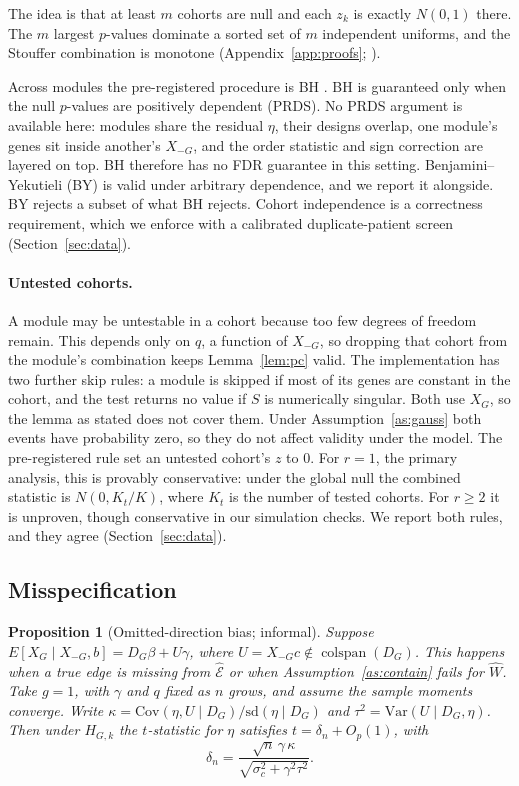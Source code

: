 \documentclass[10pt,twocolumn,letterpaper]{article}
\newtheorem{proposition}{Proposition}
\theoremstyle{remark}
\begin{document}
The idea is that at least $m$ cohorts are null and each $z_k$ is exactly $N(0,1)$ there. The $m$ largest $p$-values dominate a sorted set of $m$ independent uniforms, and the Stouffer combination is monotone (Appendix~\ref{app:proofs}; \citealp{benjamini2008pc}).

Across modules the pre-registered procedure is BH \citep{benjamini1995}. BH is guaranteed only when the null $p$-values are positively dependent (PRDS). No PRDS argument is available here: modules share the residual $\eta$, their designs overlap, one module's genes sit inside another's $X_{-G}$, and the order statistic and sign correction are layered on top. BH therefore has no FDR guarantee in this setting. Benjamini--Yekutieli (BY) is valid under arbitrary dependence, and we report it alongside. BY rejects a subset of what BH rejects. Cohort independence is a correctness requirement, which we enforce with a calibrated duplicate-patient screen (Section~\ref{sec:data}).

\paragraph{Untested cohorts.} A module may be untestable in a cohort because too few degrees of freedom remain. This depends only on $q$, a function of $X_{-G}$, so dropping that cohort from the module's combination keeps Lemma~\ref{lem:pc} valid. The implementation has two further skip rules: a module is skipped if most of its genes are constant in the cohort, and the test returns no value if $S$ is numerically singular. Both use $X_G$, so the lemma as stated does not cover them. Under Assumption~\ref{as:gauss} both events have probability zero, so they do not affect validity under the model. The pre-registered rule set an untested cohort's $z$ to 0. For $r=1$, the primary analysis, this is provably conservative: under the global null the combined statistic is $N(0,K_t/K)$, where $K_t$ is the number of tested cohorts. For $r\ge2$ it is unproven, though conservative in our simulation checks. We report both rules, and they agree (Section~\ref{sec:data}).

\subsection{Misspecification}

\begin{proposition}[Omitted-direction bias; informal]\label{prop:bias}
Suppose $E[X_G\mid X_{-G},b]=D_G\beta+U\gamma$, where $U=X_{-G}c\notin\operatorname{colspan}(D_G)$. This happens when a true edge is missing from $\hat{\mathcal E}$ or when Assumption~\ref{as:contain} fails for $\hat W$. Take $g=1$, with $\gamma$ and $q$ fixed as $n$ grows, and assume the sample moments converge. Write $\kappa=\mathrm{Cov}(\eta,U\mid D_G)/\mathrm{sd}(\eta\mid D_G)$ and $\tau^2=\mathrm{Var}(U\mid D_G,\eta)$. Then under $H_{G,k}$ the $t$-statistic for $\eta$ satisfies $t=\delta_n+O_p(1)$, with
\[
\delta_n=\frac{\sqrt n\,\gamma\,\kappa}{\sqrt{\sigma_c^2+\gamma^2\tau^2}} .
\]
\end{proposition}
\end{document}
